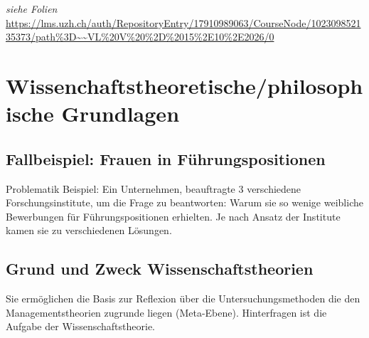 \textit{siehe Folien} \url{https://lms.uzh.ch/auth/RepositoryEntry/17910989063/CourseNode/102309852135373/path%3D~~VL%20V%20%2D%2015%2E10%2E2026/0}

\section{Wissenchaftstheoretische/philosophische Grundlagen}

\subsection{Fallbeispiel: Frauen in Führungspositionen}

Problematik Beispiel: Ein Unternehmen, beauftragte 3 verschiedene Forschungsinstitute, um die Frage zu beantworten: Warum sie so wenige weibliche Bewerbungen für Führungspositionen erhielten.
Je nach Ansatz der Institute kamen sie zu verschiedenen Lösungen.

\subsection{Grund und Zweck Wissenschaftstheorien}
Sie ermöglichen die Basis zur Reflexion über die Untersuchungsmethoden die den Managementstheorien zugrunde liegen (Meta-Ebene). Hinterfragen ist die Aufgabe der Wissenschaftstheorie.
